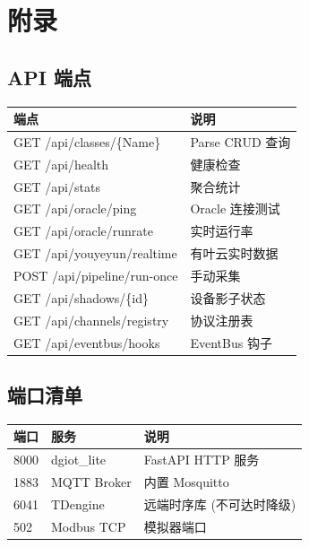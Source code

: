 \documentclass[12pt,a4paper]{ctexart}
\begin{document}
\section{附录}

\subsection{API 端点}
\begin{longtable}{p{5cm}p{6cm}}
\toprule
\textbf{端点} & \textbf{说明} \\
\midrule
GET /api/classes/\{Name\} & Parse CRUD 查询 \\
GET /api/health & 健康检查 \\
GET /api/stats & 聚合统计 \\
GET /api/oracle/ping & Oracle 连接测试 \\
GET /api/oracle/runrate & 实时运行率 \\
GET /api/youyeyun/realtime & 有叶云实时数据 \\
POST /api/pipeline/run-once & 手动采集 \\
GET /api/shadows/\{id\} & 设备影子状态 \\
GET /api/channels/registry & 协议注册表 \\
GET /api/eventbus/hooks & EventBus 钩子 \\
\bottomrule
\end{longtable}

\subsection{端口清单}
\begin{table}[H]\centering
\begin{tabular}{p{2cm}p{3cm}p{7cm}}
\toprule
\textbf{端口} & \textbf{服务} & \textbf{说明} \\
\midrule
8000 & dgiot\_lite & FastAPI HTTP 服务 \\
1883 & MQTT Broker & 内置 Mosquitto \\
6041 & TDengine & 远端时序库 (不可达时降级) \\
502 & Modbus TCP & 模拟器端口 \\
\bottomrule
\end{tabular}
\end{table}
\end{document}
